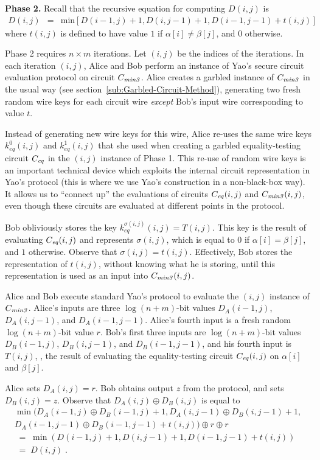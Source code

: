 \vspace{1ex}
\noindent
\textbf{Phase 2.}
Recall that the recursive equation for computing $D(i,j)$ is 
\begin{eqnarray*}
D(i,j) & = & \mbox{min} [ D(i-1,j)+1, D(i,j-1)+1, D(i-1,j-1)+t(i,j) ]
\end{eqnarray*}
where $t(i,j)$ is defined to have value $1$ if $\alpha[i] \neq \beta[j]$,
and $0$ otherwise.

Phase 2 requires $n \times m$ iterations.  Let $(i,j)$ be the indices
of the iterations.  In each iteration $(i,j)$, Alice and Bob perform an
instance of Yao's secure circuit evaluation protocol on circuit $C_{\mathit{min3}}$.
Alice creates a garbled instance of $C_{\mathit{min3}}$ in the usual way (see
section~\ref{sub:Garbled-Circuit-Method}), generating two fresh random wire keys for each
circuit wire \emph{except} Bob's input wire corresponding to value $t$.

Instead of generating new wire keys for this wire, Alice re-uses the
same wire keys $k^0_{\mathit{eq}}(i,j)$ and $k^1_{\mathit{eq}}(i,j)$
that she used when creating a garbled equality-testing circuit $C_{\mathit{eq}}$
in the $(i,j)$ instance of Phase 1.  This re-use of random wire keys
is an important technical device which exploits the internal circuit
representation in Yao's protocol (this is where we use Yao's construction
in a non-black-box way).  It allows us to ``connect up'' the evaluations
of circuits $C_{\mathit{eq}}(i,j)$ and $C_{\mathit{min3}}(i,j)$, even though these circuits are
evaluated at different points in the protocol.

Bob obliviously stores the key $k^{\sigma(i,j)}_{\mathit{eq}}(i,j) =
T(i,j)$.  This key is the result of evaluating $C_{\mathit{eq}}(i,j)$ and represents
$\sigma(i,j)$, which is equal to $0$ if $\alpha[i]=\beta[j]$, and $1$
otherwise.  Observe that $\sigma(i,j)=t(i,j)$.  Effectively, Bob stores
the representation of $t(i,j)$, without knowing what he is storing,
until this representation is used as an input into $C_{\mathit{min3}}(i,j)$.

Alice and Bob execute standard Yao's protocol to evaluate the $(i,j)$
instance of $C_{\mathit{min3}}$.  Alice's inputs are three $\log(n+m)$-bit values
$D_A(i-1,j)$, $D_A(i,j-1)$, and $D_A(i-1,j-1)$.  Alice's fourth input is
a fresh random $\log(n+m)$-bit value $r$. Bob's first three inputs are
$\log(n+m)$-bit values $D_B(i-1,j)$, $D_B(i,j-1)$, and $D_B(i-1,j-1)$,
and his fourth input is $T(i,j)$, \ie, the result of evaluating the
equality-testing circuit $C_{\mathit{eq}}(i,j)$ on $\alpha[i]$ and $\beta[j]$.

Alice sets $D_A(i,j)=r$.  Bob obtains output $z$ from the protocol,
and sets $D_B(i,j)=z$.  Observe that $D_A (i,j) \oplus D_B (i,j)$ is equal to
\[
\begin{array}{l}
\min( D_A(i-1,j) \oplus D_B(i-1,j) + 1, D_A(i,j-1) \oplus D_B(i,j-1) +1 , \\ 
       D_A(i-1,j-1) \oplus D_B(i-1,j-1) + t(i,j) ) \oplus r \oplus r \\ 
\; = \; \min( D(i-1,j)+1, D(i,j-1)+1,D(i-1,j-1)+t(i,j)) \\
\; = \; D(i,j) \;.
\end{array}
\]

